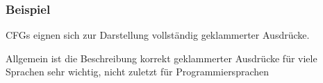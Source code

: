 \documentclass[onlymath]{beamer}
\begin{document}
\begin{frame}\frametitle{Beispiel}

CFGs eignen sich zur Darstellung vollständig geklammerter Ausdrücke.
\bigskip

\bigskip

Allgemein ist die Beschreibung korrekt geklammerter Ausdrücke für viele Sprachen sehr wichtig, nicht zuletzt für Programmiersprachen

\end{frame}
\end{document}
